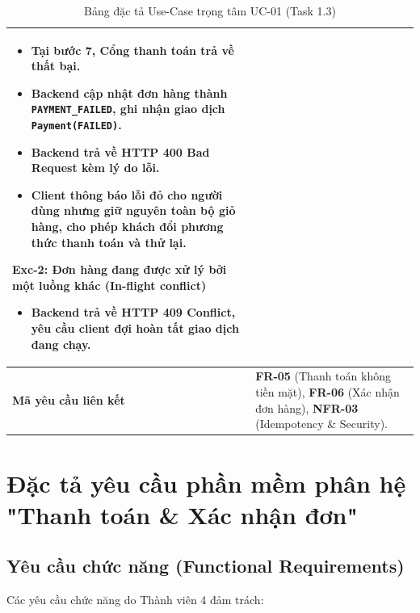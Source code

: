\documentclass[a4paper]{article}
\begin{document}
\begin{table}[h!]
\begin{tabular}{|p{3.5cm}|p{11.5cm}|}
\begin{itemize}
    \item Tại bước 7, Cổng thanh toán trả về thất bại.
    \item Backend cập nhật đơn hàng thành \texttt{PAYMENT\_FAILED}, ghi nhận giao dịch \texttt{Payment(FAILED)}.
    \item Backend trả về HTTP 400 Bad Request kèm lý do lỗi.
    \item Client thông báo lỗi đỏ cho người dùng nhưng \textbf{giữ nguyên toàn bộ giỏ hàng}, cho phép khách đổi phương thức thanh toán và thử lại.
\end{itemize}
\textbf{Exc-2: Đơn hàng đang được xử lý bởi một luồng khác (In-flight conflict)}
\begin{itemize}
    \item Backend trả về HTTP 409 Conflict, yêu cầu client đợi hoàn tất giao dịch đang chạy.
\end{itemize} \\ \hline
\textbf{Mã yêu cầu liên kết} & \textbf{FR-05} (Thanh toán không tiền mặt), \textbf{FR-06} (Xác nhận đơn hàng), \textbf{NFR-03} (Idempotency \& Security). \\ \hline
\end{tabular}
\caption{Bảng đặc tả Use-Case trọng tâm UC-01 (Task 1.3)}
\end{table}

\newpage
\section{Đặc tả yêu cầu phần mềm phân hệ "Thanh toán \& Xác nhận đơn"}

\subsection{Yêu cầu chức năng (Functional Requirements)}
Các yêu cầu chức năng do Thành viên 4 đảm trách:
\end{document}
